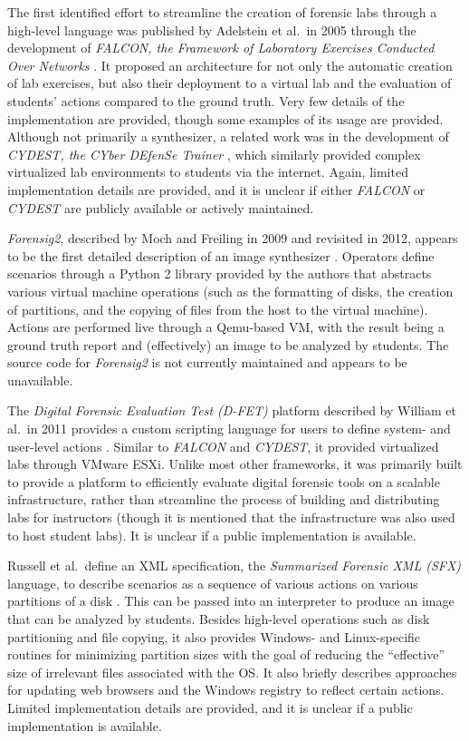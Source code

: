 The first identified effort to streamline the creation of forensic labs
through a high-level language was published by Adelstein et al.~in 2005
through the development of \emph{FALCON, the Framework of Laboratory
Exercises Conducted Over Networks}
\cite{adelsteinAutomaticallyCreatingRealistic2005}. It proposed an
architecture for not only the automatic creation of lab exercises, but
also their deployment to a virtual lab and the evaluation of students'
actions compared to the ground truth. Very few details of the
implementation are provided, though some examples of its usage are
provided. Although not primarily a synthesizer, a related work was in
the development of \emph{CYDEST, the CYber DEfenSe Trainer}
\cite{bruecknerAutomatedComputerForensics2008}, which similarly
provided complex virtualized lab environments to students via the
internet. Again, limited implementation details are provided, and it is
unclear if either \emph{FALCON} or \emph{CYDEST} are publicly available
or actively maintained.

\emph{Forensig2}, described by Moch and Freiling in 2009 and revisited
in 2012, appears to be the first detailed description of an image
synthesizer
\cite{mochForensicImageGenerator2009,mochEvaluatingForensicImage2012}.
Operators define scenarios through a Python 2 library provided by the
authors that abstracts various virtual machine operations (such as the
formatting of disks, the creation of partitions, and the copying of
files from the host to the virtual machine). Actions are performed live
through a Qemu-based VM, with the result being a ground truth report and
(effectively) an image to be analyzed by students. The source code for
\emph{Forensig2} is not currently maintained and appears to be
unavailable.

The \emph{Digital Forensic Evaluation Test (D-FET)} platform described
by William et al.~in 2011 provides a custom scripting language for users
to define system- and user-level actions
\cite{williamCloudbasedDigitalForensics2011}. Similar to
\emph{FALCON} and \emph{CYDEST}, it provided virtualized labs through
VMware ESXi. Unlike most other frameworks, it was primarily built to
provide a platform to efficiently evaluate digital forensic tools on a
scalable infrastructure, rather than streamline the process of building
and distributing labs for instructors (though it is mentioned that the
infrastructure was also used to host student labs). It is unclear if a
public implementation is available.

Russell et al.~define an XML specification, the \emph{Summarized
Forensic XML (SFX)} language, to describe scenarios as a sequence of
various actions on various partitions of a disk
\cite{russellForensicImageDescription2012}. This can be passed into
an interpreter to produce an image that can be analyzed by students.
Besides high-level operations such as disk partitioning and file
copying, it also provides Windows- and Linux-specific routines for
minimizing partition sizes with the goal of reducing the ``effective''
size of irrelevant files associated with the OS. It also briefly
describes approaches for updating web browsers and the Windows registry
to reflect certain actions. Limited implementation details are provided,
and it is unclear if a public implementation is available.

